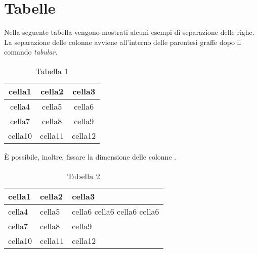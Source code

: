 \section{Tabelle}

Nella seguente tabella vengono mostrati alcuni esempi di separazione delle righe. La separazione delle colonne avviene  all'interno delle parentesi graffe dopo il comando \textit{tabular}.
\begin{table}[h]
    \centering
    \begin{tabular}{ ||c|c|c|| } 
        \hline
        cella1  & cella2  & cella3  \\
        \hline
        \hline 
        cella4  & cella5  & cella6  \\ 
        \hline
        cella7  & cella8  & cella9  \\ 
        cella10 & cella11 & cella12 \\ 
        \hline
    \end{tabular}
    \caption{Tabella 1}
    \label{tab:tabella1}
\end{table}

È possibile, inoltre, fissare la dimensione delle colonne \cite{prova2}.
\begin{table}[ht]
    \centering
    \begin{tabular}{ | m{3cm} | m{5cm} | m{1.5cm} | } 
        \hline
        cella1  & cella2  & cella3                      \\
        \hline
        \hline 
        cella4  & cella5  & cella6 cella6 cella6 cella6 \\ 
        \hline
        cella7  & cella8  & cella9                      \\ 
        cella10 & cella11 & cella12                     \\ 
        \hline
    \end{tabular}
    \caption{Tabella 2}
    \label{tab:tabella2}
\end{table}